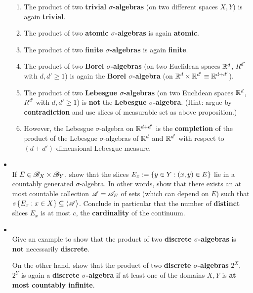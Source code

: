 \documentclass[11pt]{article}
\begin{document}
\begin{itemize}
\begin{proposition}
\begin{enumerate}
\item The product of two \textbf{trivial $\sigma$-algebras} (on two different spaces $X, Y$) is again \textbf{trivial}.

\item The product of two \textbf{atomic $\sigma$-algebras} is again \textbf{atomic}.

\item The product of two \textbf{finite $\sigma$-algebras} is again \textbf{finite}.

\item The product of two \textbf{Borel $\sigma$-algebras} (on two Euclidean spaces ${\mathbb R}^d$, $R^{d'}$ with $d, d' \ge 1$) is again the \textbf{Borel $\sigma$-algebra} (on ${\mathbb R}^d \times {\mathbb R}^{d'} \equiv {\mathbb R}^{d+d'}$).

\item The product of two \textbf{Lebesgue $\sigma$-algebras} (on two Euclidean spaces ${\mathbb R}^d$, $R^{d'}$ with $d, d' \ge 1$) is \textbf{not} the \textbf{Lebesgue
$\sigma$-algebra}. (Hint: argue by \textbf{contradiction} and use slices of measurable set as above proposition.)

\item However, the Lebesgue $\sigma$-algebra on ${\mathbb R}^{d+d'}$ is the \textbf{completion} of the product of the Lebesgue $\sigma$-algebras of ${\mathbb R}^d$ and ${\mathbb R}^{d'}$ with respect to $(d + d')$-dimensional Lebesgue measure.
\end{enumerate}
\end{proposition}

\item \begin{exercise} \citep{tao2011introduction}\\
If $E \in {\mathscr B}_X \times {\mathscr B}_Y$, show that the slices $E_x := \left\{y \in Y: (x, y) \in E\right\}$ lie in a countably generated $\sigma$-algebra. In other words, show that there exists an at most countable collection ${\mathscr A} = {\mathscr A}_E$ of sets (which can depend on $E$) such that $s\left\{E_x : x \in X\right\} \subseteq \langle {\mathscr A} \rangle$. Conclude in particular that the number of \textbf{distinct} slices $E_x$ is at most $c$, the \textbf{cardinality} of the continuum.
\end{exercise}

\item   \begin{exercise} \citep{tao2011introduction}\\
Give an example to show that the product of two \textbf{discrete $\sigma$-algebras} is \textbf{not} necessarily \textbf{discrete}.

On the other hand, show that the product of two \textbf{discrete $\sigma$-algebras} $2^X$, $2^Y$ is again a \textbf{discrete $\sigma$-algebra} if at least one of the domains $X, Y$ is \textbf{at most countably infinite}.
\end{exercise}
\end{itemize}
\end{document}
